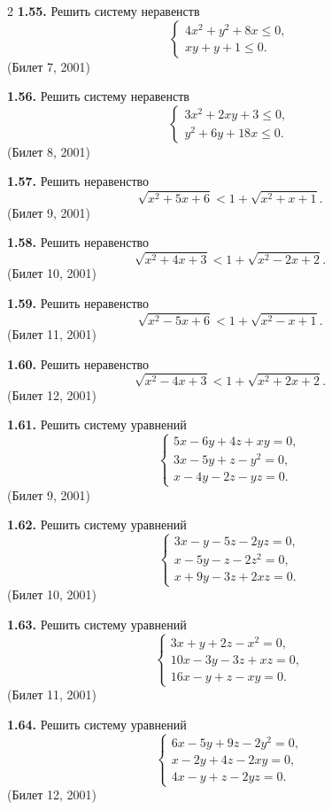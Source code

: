 \documentclass[14pt,a4paper,landscape]{extarticle}
\begin{document}
\begin{multicols}{2}
\textbf{1.55.} Решить систему неравенств
\[
\begin{cases}
4x^2 + y^2 + 8x \leqslant 0, \\
xy + y + 1 \leqslant 0.
\end{cases}
\]
\hfill \textnormal{(Билет 7, 2001)}

\textbf{1.56.} Решить систему неравенств
\[
\begin{cases}
3x^2 + 2xy + 3 \leqslant 0, \\
y^2 + 6y + 18x \leqslant 0.
\end{cases}
\]
\hfill \textnormal{(Билет 8, 2001)}

\textbf{1.57.} Решить неравенство
\[
\sqrt{x^2 + 5x + 6} < 1 + \sqrt{x^2 + x + 1}.
\]
\hfill \textnormal{(Билет 9, 2001)}

\textbf{1.58.} Решить неравенство
\[
\sqrt{x^2 + 4x + 3} < 1 + \sqrt{x^2 - 2x + 2}.
\]
\hfill \textnormal{(Билет 10, 2001)}

\textbf{1.59.} Решить неравенство
\[
\sqrt{x^2 - 5x + 6} < 1 + \sqrt{x^2 - x + 1}.
\]
\hfill \textnormal{(Билет 11, 2001)}

\textbf{1.60.} Решить неравенство
\[
\sqrt{x^2 - 4x + 3} < 1 + \sqrt{x^2 + 2x + 2}.
\]
\hfill \textnormal{(Билет 12, 2001)}

\textbf{1.61.} Решить систему уравнений
\[
\begin{cases}
5x - 6y + 4z + xy = 0, \\
3x - 5y + z - y^2 = 0, \\
x - 4y - 2z - yz = 0.
\end{cases}
\]
\hfill \textnormal{(Билет 9, 2001)}

\textbf{1.62.} Решить систему уравнений
\[
\begin{cases}
3x - y - 5z - 2yz = 0, \\
x - 5y - z - 2z^2 = 0, \\
x + 9y - 3z + 2xz = 0.
\end{cases}
\]
\hfill \textnormal{(Билет 10, 2001)}

\textbf{1.63.} Решить систему уравнений
\[
\begin{cases}
3x + y + 2z - x^2 = 0, \\
10x - 3y - 3z + xz = 0, \\
16x - y + z - xy = 0.
\end{cases}
\]
\hfill \textnormal{(Билет 11, 2001)}

\textbf{1.64.} Решить систему уравнений
\[
\begin{cases}
6x - 5y + 9z - 2y^2 = 0, \\
x - 2y + 4z - 2xy = 0, \\
4x - y + z - 2yz = 0.
\end{cases}
\]
\hfill \textnormal{(Билет 12, 2001)}


\end{multicols}
\end{document}
